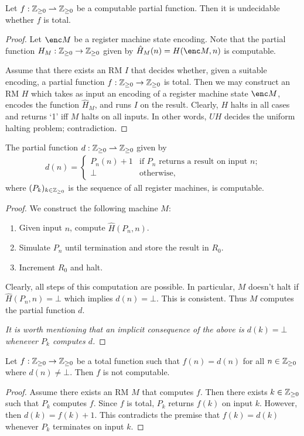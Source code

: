 \documentclass{article}
\begin{document}
\begin{claim*}[a, 2]
	Let $f:\mathbb{Z}_{\geq 0}\rightharpoonup\mathbb{Z}_{\geq 0}$ be a computable partial function. Then it is undecidable whether $f$
	is total.
	\begin{proof}
		Let $\enc M$ be a register machine state encoding.  Note that the partial function $H_M:\mathbb{Z}_{\geq 0}\to\mathbb{Z}_{\geq 0}$
		given by $\hat H_M(n)=H(\enc M, n)$ is computable.

		Assume that there exists an RM $I$ that decides whether, given a suitable encoding, a partial
		function $f:\mathbb{Z}_{\geq 0}\to\mathbb{Z}_{\geq 0}$ is total. Then we may construct an RM $H$ which takes as input an encoding
		of a register machine state $\enc M$, encodes the function $\hat H_M$, and runs $I$ on the result.
		Clearly, $H$ halts in all cases and returns `1' iff $M$ halts on all inputs. In other words,
		$UH$ decides the uniform halting problem; contradiction.
	\end{proof}
\end{claim*}

\begin{claim*}[b]
	The partial function $d:\mathbb{Z}_{\geq 0}\rightharpoonup\mathbb{Z}_{\geq 0}$ given by
	\begin{align*}
		d(n)=\begin{cases}
			     P_n(n)+1 & \text{if $P_n$ returns a result on input $n$;} \\
			     \bot     & \text{otherwise,}
		     \end{cases}
	\end{align*}
	where $(P_k)_{k\in\mathbb{Z}_{\geq 0}}$ is the sequence of all register machines, is
	computable.
	\begin{proof}
		We construct the following machine $M$:
		\begin{enumerate}
			\item Given input $n$, compute $\hat H(P_n,n)$.
			\item Simulate $P_n$ until termination and store the result in $R_0$.
			\item Increment $R_0$ and halt.
		\end{enumerate}
		Clearly, all steps of this computation are possible. In particular, $M$ doesn't halt
		if $\hat H(P_n,n)=\bot$ which implies $d(n)=\bot$. This is consistent. Thus $M$
		computes the partial function $d$.

		\emph{It is worth mentioning that an implicit consequence of the above is $d(k)=\bot$
			whenever $P_k$ computes $d$.}
	\end{proof}
\end{claim*}

\begin{claim*}[c]
	Let $f:\mathbb{Z}_{\geq 0}\to\mathbb{Z}_{\geq 0}$ be a total function such that $f(n)=d(n)$ for all $n\in\mathbb{Z}_{\geq 0}$ where
	$d(n)\not=\bot$. Then $f$ is not computable.
	\begin{proof}
		Assume there exists an RM $M$ that computes $f$. Then there exists $k\in\mathbb{Z}_{\geq 0}$ such that
		$P_k$ computes $f$. Since $f$ is total, $P_k$ returns $f(k)$ on input $k$. However,
		then $d(k)=f(k)+1$. This contradicts the premise that $f(k)=d(k)$ whenever $P_k$ terminates
		on input $k$.
	\end{proof}
\end{claim*}
\end{document}
